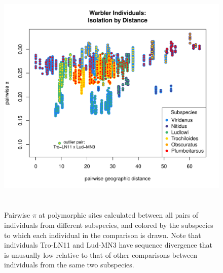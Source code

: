 \documentclass[12pt]{article}
\begin{document}
\begin{figure}
\centering
	{\includegraphics[width=5in,height=4.3in]{figs/warblers/warb_ind_pairwise_pi.pdf}}
	\caption{Pairwise $\pi$ at polymorphic sites calculated between all pairs of individuals from different subspecies, and colored by the subspecies to which each individual in the comparison is drawn.  Note that individuals Tro-LN11 and Lud-MN3 have sequence divergence that is unusually low relative to that of other comparisons between individuals from the same two subspecies.}\label{sfig:warb_ind_pwp}
\end{figure}

\end{document}
